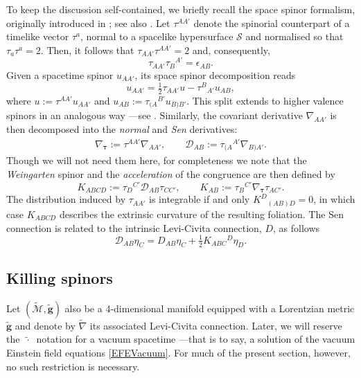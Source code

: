 \documentclass[10pt,a4paper]{article}
\theoremstyle{plain}
\def\bmg{{\bm g}}
\begin{document}
To keep the discussion self-contained, we briefly recall the space spinor
formalism, originally introduced in \cite{Som80}; see also \cite{GarVal08c,BaeVal10b,CFEbook}.  Let $\tau^{AA'}$
denote the spinorial counterpart of a timelike vector $\tau^{a}$,
normal to a spacelike hypersurface $\mathcal{S}$ and normalised so
that $\tau_{a}\tau^{a}=2$.  Then, it follows that
$\tau_{AA'}\tau^{AA'}=2$ and, consequently,
\[\tau_{AA'}\tau_B{}^{A'}=\epsilon_{AB}.\]
Given a spacetime spinor $u_{AA'}$, its space spinor decomposition
reads
\[
u_{AA'}= \tfrac{1}{2}\tau_{AA'}u-\tau^{B}{}_{A'}u_{AB},
\]
where $u:=\tau^{AA'}u_{AA'}$ and $u_{AB}:=\tau_{(A}{}^{B'}u_{B)B'}$.
This split extends to higher valence spinors in an analogous way
---see \cite{GarVal08c,BaeVal10b,CFEbook}. Similarly, the covariant
derivative $\nabla_{AA'}$ is then decomposed into the \emph{normal}
and \emph{Sen} derivatives:
\begin{align*}
  \nabla_{\bm\tau} := \tau^{AA'}\nabla_{AA'},\qquad \mathcal{D}_{AB}:=
  \tau_{(A}{}^{A'}\nabla_{B)A'}.
\end{align*}
Though we will not need them here, for completeness we note that the
\emph{Weingarten} spinor and the \emph{acceleration} of the congruence
are then defined by
\[K_{ABCD} := \tau_{D}{}^{C'} \mathcal{D}_{AB}\tau_{CC'},\qquad K_{AB} := \tau_{B}{}^{C'} \nabla_{\bm\tau}\tau_{AC'}.
\]
The distribution induced by $\tau_{AA'}$ is integrable if and only
$K^D{}_{(AB)D}=0$, in which case $K_{ABCD}$ describes the extrinsic
curvature of the resulting foliation.
The Sen connection is related to the
intrinsic Levi-Civita connection, $D$, as follows
\[\mathcal{D}_{AB}\eta_C = D_{AB}\eta_C + \tfrac{1}{2}K_{ABC}{}^D\eta_D. \]

\subsection{Killing spinors}\label{Sec:KillingSpinors}

Let $(\tilde{\mathcal{M}},\tilde{\bmg})$ also be a
4-dimensional manifold equipped with a Lorentzian metric
$\tilde{\bmg}$ and denote by $\tilde{\nabla}$ its associated
Levi-Civita connection. Later, we will reserve the $~\tilde{\cdot}~$
notation for a vacuum spacetime ---that is to say, a solution of the
vacuum Einstein field equations \eqref{EFEVacuum}. For much of the present section, however, no such restriction is necessary.
\medskip
\end{document}
